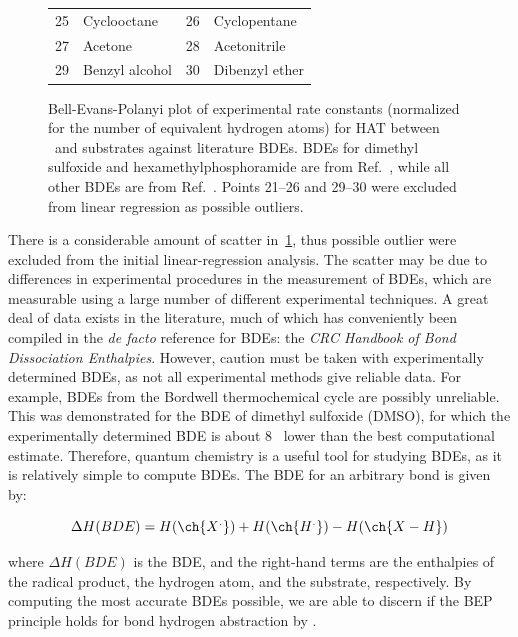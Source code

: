 \begin{figure}[!htbp]
\begin{tabularx}{\textwidth}{| l X l X |}
  25 & Cyclooctane & 26 & Cyclopentane  \\
  27 & Acetone & 28 & Acetonitrile \\
  29 & Benzyl alcohol & 30 & Dibenzyl ether \\
  \hline
\end{tabularx}
  \caption[Bell-Evans-Polanyi plot of experimental rate constants against literature BDEs.]{Bell-Evans-Polanyi plot of experimental rate constants (normalized for the number of equivalent hydrogen atoms) for HAT between \cumo\ and substrates against literature BDEs. BDEs for dimethyl sulfoxide and hexamethylphosphoramide are from Ref.~\protect{}, while all other BDEs are from Ref.~\protect{}. Points 21--26 and 29--30 were excluded from linear regression as possible outliers.}
\label{fig:bep-expt}
\end{figure}

There is a considerable amount of scatter in~\ref{fig:bep-expt}, thus possible outlier were excluded from the initial linear-regression analysis. The scatter may be due to differences in experimental procedures in the measurement of BDEs, which are measurable using a large number of different experimental techniques. A great deal of data exists in the literature, much of which has conveniently been compiled in the \emph{de facto} reference for BDEs: the \emph{CRC Handbook of Bond Dissociation Enthalpies}.\cite{Luo2002} However, caution must be taken with experimentally determined BDEs, as not all experimental methods give reliable data. For example, BDEs from the Bordwell\cite{Bordwell1988} thermochemical cycle are possibly unreliable.\cite{Salamone2012, Miller2016} This was demonstrated for the BDE of dimethyl sulfoxide (DMSO), for which the experimentally determined BDE is about 8 \kcalmol\ lower than the best computational estimate.\cite{Salamone2012} Therefore, quantum chemistry is a useful tool for studying BDEs, as it is relatively simple to compute BDEs. The BDE for an arbitrary  bond is given by:

\begin{equation}
  \Delta H(BDE) =  H(\ch{X^.}) + H(\ch{H^.}) - H(\ch{X-H})
\end{equation}

\noindent where $\Delta H(BDE)$ is the BDE, and the right-hand terms are the enthalpies of the radical product, the hydrogen atom, and the substrate, respectively. By computing the most accurate BDEs possible, we are able to discern if the BEP principle holds for  bond hydrogen abstraction by \cumo.

